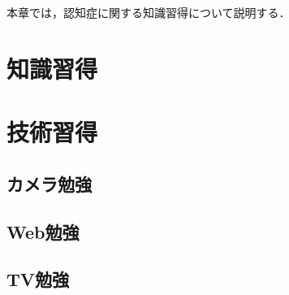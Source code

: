 \documentclass[../report]{subfiles}
\begin{document}
本章では，認知症に関する知識習得について説明する．


\section{知識習得}


\section{技術習得}
\subsection{カメラ勉強}

\subsection{Web勉強}

\subsection{TV勉強}
\end{document}
